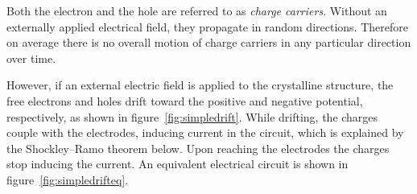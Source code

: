 Both the electron and the hole are referred to as \emph{charge carriers}. Without an externally applied electrical field, they propagate in random directions. Therefore on average there is no overall motion of charge carriers in any particular direction over time.

However, if an external electric field is applied to the crystalline structure, the free electrons and holes drift toward the positive and negative potential, respectively, as shown in figure~\ref{fig:simpledrift}. While drifting, the charges couple with the electrodes, inducing current in the circuit, which is explained by the Shockley--Ramo theorem below. Upon reaching the electrodes the charges stop inducing the current. An equivalent electrical circuit is shown in figure~\ref{fig:simpledrifteq}.






